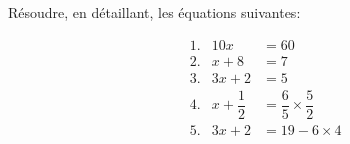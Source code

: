 \documentclass{beamer}
\begin{document}
\small

\begin{frame}
	Résoudre, en détaillant, les équations suivantes:

	\begin{center}
		\begin{align*}
			 & 1. & 10x              & = 60                          \\[0.5em]
			 & 2. & x + 8            & = 7                           \\[0.5em]
			 & 3. & 3x +2            & = 5                           \\[0.5em]
			 & 4. & x + \dfrac{1}{2} & = \dfrac{6}{5} × \dfrac{5}{2} \\[0.5em]
			 & 5. & 3x + 2           & = 19 - 6 × 4                  \\
		\end{align*}
	\end{center}
\end{frame}
\end{document}
